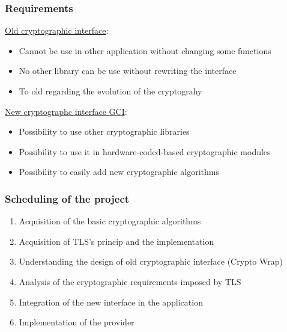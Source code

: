 \begin{frame}

\frametitle{Requirements}

\underline{Old cryptographic interface}:
\begin{itemize}

	\item Cannot be use in other application without changing some functions
	\item No other library can be use without rewriting the interface
	\item To old regarding the evolution of the cryptograhy

\end{itemize}

\vspace{0.5cm}

\underline{New cryptographc interface GCI}:
\begin{itemize}
  \item Possibility to use other cryptographic libraries
  \item Possibility to use it in hardware-coded-based cryptographic  
  modules
  \item Possibility to easily add new cryptographic algorithms

\end{itemize}

\end{frame}

\begin{frame}

\frametitle{Scheduling of the project}

\begin{enumerate}
  \item Acquisition of the basic cryptographic algorithms
  \vspace{0.25cm}
  \item Acquisition of TLS's princip and the implementation \embtls
  \vspace{0.25cm}
  \item Understanding the design of old cryptographic interface (Crypto Wrap)
  \vspace{0.25cm}
  \item Analysis of the cryptographic requirements imposed by TLS
  \vspace{0.25cm}
  \item Integration of the new interface in the application \embtls
  \vspace{0.25cm}
  \item Implementation of the provider \tomcrypt 
\end{enumerate}





\end{frame}




